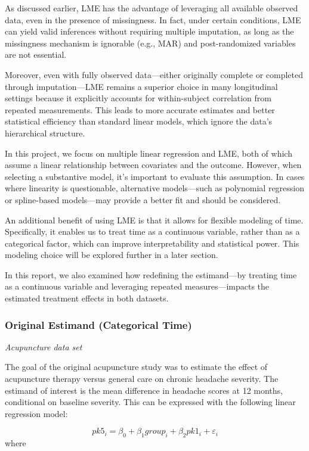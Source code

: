 \documentclass{article}
\begin{document}
As discussed earlier, LME has the advantage of leveraging all available
observed data, even in the presence of missingness. In fact, under
certain conditions, LME can yield valid inferences without requiring
multiple imputation, as long as the missingness mechanism is ignorable
(e.g., MAR) and post-randomized variables are not essential.

Moreover, even with fully observed data---either originally complete or
completed through imputation---LME remains a superior choice in many
longitudinal settings because it explicitly accounts for within-subject
correlation from repeated measurements. This leads to more accurate
estimates and better statistical efficiency than standard linear models,
which ignore the data's hierarchical structure.

In this project, we focus on multiple linear regression and LME, both of
which assume a linear relationship between covariates and the outcome.
However, when selecting a substantive model, it's important to evaluate
this assumption. In cases where linearity is questionable, alternative
models---such as polynomial regression or spline-based models---may
provide a better fit and should be considered.

An additional benefit of using LME is that it allows for flexible
modeling of time. Specifically, it enables us to treat time as a
continuous variable, rather than as a categorical factor, which can
improve interpretability and statistical power. This modeling choice
will be explored further in a later section.

In this report, we also examined how redefining the estimand---by
treating time as a continuous variable and leveraging repeated
measures---impacts the estimated treatment effects in both datasets.

\subsubsection{Original Estimand (Categorical
Time)}\label{original-estimand-categorical-time}

\emph{Acupuncture data set}

The goal of the original acupuncture study was to estimate the effect of
acupuncture therapy versus general care on chronic headache severity.
The estimand of interest is the mean difference in headache scores at 12
months, conditional on baseline severity. This can be expressed with the
following linear regression model:

\[pk5_i = \beta_0 + \beta_1 group_i + \beta_2 pk1_i + \varepsilon_i\]
where
\end{document}
